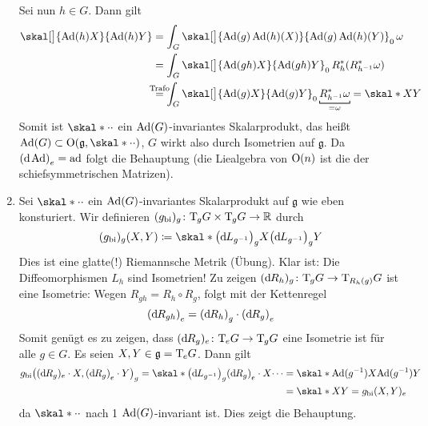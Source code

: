 \begin{beweis}
\begin{enumerate}[1)]
		Sei nun $h \in G$.
		Dann gilt 
		\begin{align}
			\skal[\big]{\Ad(h) X}{\Ad(h)Y} &= \int_G \skal[\big]{\Ad(g) \Ad(h)(X)}{ \Ad(g) \Ad(h)(Y)}_0 \, \omega \\
			&= \int_G \skal[\big]{\Ad(gh)X}{\Ad(gh)Y}_0 \, R_h^* \enbrace*{R^*_{h^{-1}} \omega} \\
			&\StackTextClap{Trafo}{=} \int_G \skal[\big]{\Ad(g) X}{ \Ad(g)Y}_0 \, \Underbracket{R^*_{h^{-1}} \omega}{=\omega} = \skal*{X}{Y}
		\end{align}
		Somit ist $\skal*{\cdot}{\cdot}$ ein $\Ad(G)$-invariantes Skalarprodukt, das heißt $\Ad(G)\subset \On(\mathfrak{g},\skal*{\cdot}{\cdot})$, $G$ wirkt also durch Isometrien auf $\mathfrak{g}$.
		Da $\enbrace*{\mathd \Ad}_e = \ad$ folgt die Behauptung (die Liealgebra von $\On(n)$ ist die der schiefsymmetrischen Matrizen).
		\item Sei $\skal*{\cdot}{\cdot}$ ein $\Ad(G)$-invariantes Skalarprodukt auf $\mathfrak{g}$ wie eben konsturiert.
		Wir definieren $(g_\bi)_g \colon \Tmap_g G \times \Tmap_g G \to \mathbb{R}$ durch
		\[
			(g_\bi)_g(X,Y) \coloneqq \skal*{\enbrace*{\mathd L_{g^{-1}}}_g X}{ \enbrace*{\mathd L_{g^{-1}}}_g Y}
		\]
		Dies ist eine glatte(!) Riemannsche Metrik (Übung).
		Klar ist: Die Diffeomorphismen $L_h$ sind Isometrien!
		Zu zeigen $(\mathd R_h)_g \colon \Tmap_g G \to \Tmap_{R_h(g)} G $ ist eine Isometrie:
		Wegen $R_{gh} = R_h \circ R_g$, folgt mit der Kettenregel
		\[
			\enbrace*{\mathd R_{gh}}_e = \enbrace*{\mathd R_h}_g \cdot \enbrace*{\mathd R_g}_e
		\]
		Somit genügt es zu zeigen, dass $(\mathd R_g)_e \colon \Tmap_e G \to \Tmap_g G$ eine Isometrie ist für alle $g \in G$.
		Es seien $X,Y \in \mathfrak{g} = \Tmap_e G$.
		Dann gilt
		\begin{align}
			g_\bi \enbrace*{(\mathd R_g)_e \cdot X, \enbrace*{\mathd R_g}_e \cdot Y}_g = \skal*{ \enbrace*{\mathd L_{g^{-1}}}_g \enbrace*{\mathd R_g}_e \cdot X}{\cdots}
			&= \skal*{\Ad(g^{-1}) X}{ \Ad(g^{-1})Y} \\
			&= \skal*{X}{Y} = g_\bi(X,Y)_e
		\end{align}
		da $\skal*{\cdot }{\cdot}$ nach 1 $\Ad(G)$-invariant ist.
		Dies zeigt die Behauptung.\qedhere
	\end{enumerate}
\end{beweis}

